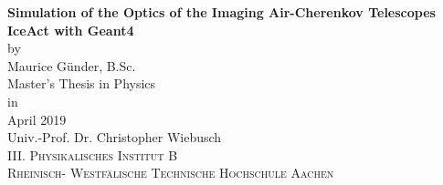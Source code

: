 \begin{titlepage}
\addtolength{\oddsidemargin}{4mm}
\begin{center}

\LARGE
\textbf{Simulation of the Optics of the Imaging Air-Cherenkov Telescopes IceAct with Geant4} \\[15mm]

{\large by}\\[1mm]
\Large
Maurice Günder, B.Sc.\\[18mm]

Master's Thesis in Physics\\[70mm]

{\large in}\\[1mm]
April 2019\\[35mm]

Univ.-Prof. Dr. Christopher Wiebusch \\\textsc{III. Physikalisches Institut B \\Rheinisch- Westfälische Technische Hochschule Aachen}

\end{center}
\end{titlepage}